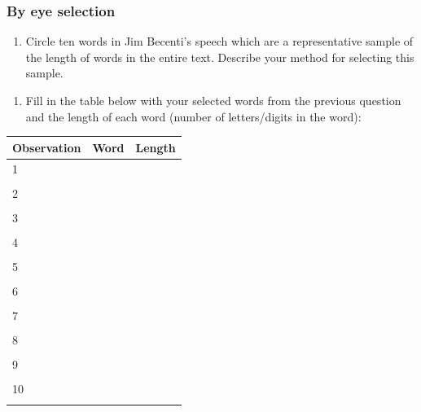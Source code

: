\documentclass[
]{report}
\providecommand{\tightlist}{%
  \setlength{\itemsep}{0pt}\setlength{\parskip}{0pt}}
\begin{document}
\subsubsection*{By eye selection}\label{by-eye-selection}

\begin{enumerate}
\def\labelenumi{\arabic{enumi}.}
\tightlist
\item
  Circle ten words in Jim Becenti's speech which are a representative sample of the length of words in the entire text. Describe your method for selecting this sample.
\end{enumerate}

\vspace{0.3in}

\begin{enumerate}
\def\labelenumi{\arabic{enumi}.}
\setcounter{enumi}{1}
\tightlist
\item
  Fill in the table below with your selected words from the previous question and the length of each word (number of letters/digits in the word):
  \vspace{1mm}
\end{enumerate}

\begin{center}
\begin{tabular}{|l|p{3in}|p{1in}|} \hline
Observation & Word & Length  \\ \hline
1 & & \\ 
& & \\ \hline
2 & & \\ 
& & \\ \hline
3 & & \\ 
& & \\ \hline
4 & & \\ 
& & \\ \hline
5 & & \\ 
& & \\ \hline
6 & & \\ 
& & \\ \hline
7 & & \\
& & \\ \hline
8 & & \\ 
& & \\ \hline
9 & & \\ 
& & \\ \hline
10 & & \\ 
& & \\ \hline
\end{tabular}
\end{center}
\end{document}

